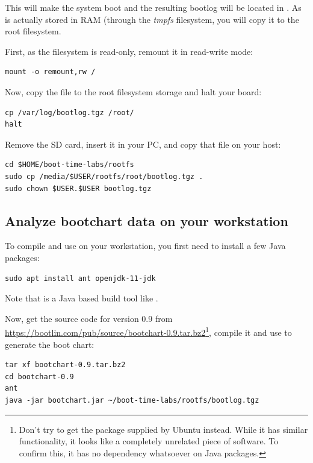 This will make the system boot and the resulting bootlog will be located
in . As  is actually stored in
RAM (through the {\em tmpfs} filesystem, you will copy it to the root
filesystem.

First, as the filesystem is read-only, remount it in read-write mode:
\begin{verbatim}
mount -o remount,rw /
\end{verbatim}

Now, copy the file to the root filesystem storage and halt your board:

\begin{verbatim}
cp /var/log/bootlog.tgz /root/
halt
\end{verbatim}

Remove the SD card, insert it in your PC, and copy that file on your host:

\begin{verbatim}
cd $HOME/boot-time-labs/rootfs
sudo cp /media/$USER/rootfs/root/bootlog.tgz .
sudo chown $USER.$USER bootlog.tgz
\end{verbatim}

\subsection{Analyze bootchart data on your workstation}

To compile and use  on your workstation, you first need to
install a few Java packages:

\begin{verbatim}
sudo apt install ant openjdk-11-jdk
\end{verbatim}

Note that  is a Java based build tool like .

Now, get the  source code for version 0.9 from
\url{https://bootlin.com/pub/source/bootchart-0.9.tar.bz2}\footnote{Don't try to get the  package supplied by
Ubuntu instead. While it has similar functionality, it looks like a completely
unrelated piece of software. To confirm this, it has no dependency
whatsoever on Java packages.}, compile it and use  to generate the boot
chart:

\begin{verbatim}
tar xf bootchart-0.9.tar.bz2
cd bootchart-0.9
ant
java -jar bootchart.jar ~/boot-time-labs/rootfs/bootlog.tgz
\end{verbatim}

